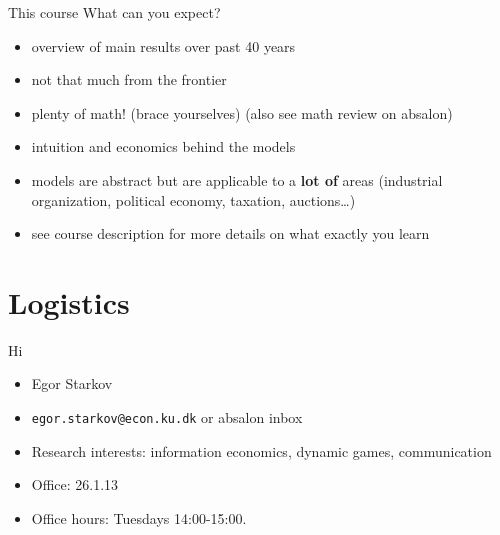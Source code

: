 \documentclass[english,10pt
,aspectratio=169
]{beamer}
\begin{document}
\begin{frame}{This course}
	What can you expect?
	\begin{itemize}
		\item overview of main results over past 40 years
		\item not that much from the frontier
		\item plenty of math! (brace yourselves) (also see math review on absalon)
		\item intuition and economics behind the models
		\item models are abstract but are applicable to a \textbf{lot of} areas (industrial organization, political economy, taxation, auctions\ldots{})
		\item see course description for more details on what exactly you learn
	\end{itemize}
\end{frame}







\section{Logistics}

\begin{frame}{Hi}
\begin{itemize}
	\item Egor Starkov
	\item \texttt{egor.starkov@econ.ku.dk} or absalon inbox
	\item Research interests: information economics, dynamic games, communication
	\item Office: 26.1.13
	\item Office hours: Tuesdays 14:00-15:00.
\end{itemize}
\end{frame}
\end{document}
